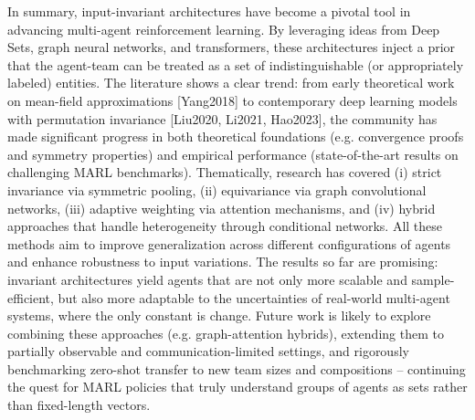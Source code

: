 \documentclass{article}
\begin{document}
In summary, input-invariant architectures have become a pivotal tool in advancing multi-agent reinforcement learning. By leveraging ideas from Deep Sets, graph neural networks, and transformers, these architectures inject a prior that the agent-team can be treated as a set of indistinguishable (or appropriately labeled) entities. The literature shows a clear trend: from early theoretical work on mean-field approximations [Yang2018] to contemporary deep learning models with permutation invariance [Liu2020, Li2021, Hao2023], the community has made significant progress in both theoretical foundations (e.g. convergence proofs and symmetry properties) and empirical performance (state-of-the-art results on challenging MARL benchmarks). Thematically, research has covered (i) strict invariance via symmetric pooling, (ii) equivariance via graph convolutional networks, (iii) adaptive weighting via attention mechanisms, and (iv) hybrid approaches that handle heterogeneity through conditional networks. All these methods aim to improve generalization across different configurations of agents and enhance robustness to input variations. The results so far are promising: invariant architectures yield agents that are not only more scalable and sample-efficient, but also more adaptable to the uncertainties of real-world multi-agent systems, where the only constant is change. Future work is likely to explore combining these approaches (e.g. graph-attention hybrids), extending them to partially observable and communication-limited settings, and rigorously benchmarking zero-shot transfer to new team sizes and compositions – continuing the quest for MARL policies that truly understand groups of agents as sets rather than fixed-length vectors.


\printbibliography
\end{document}
